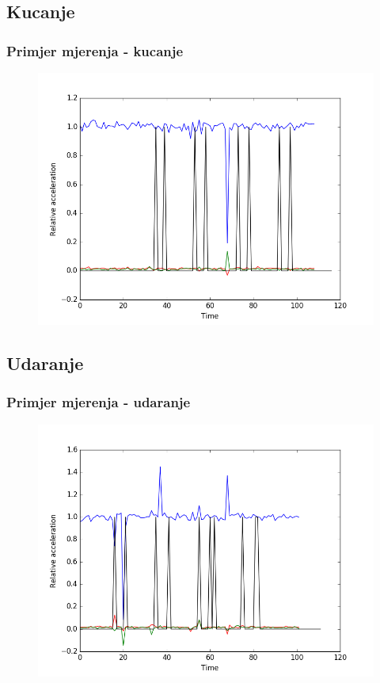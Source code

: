 \documentclass[12pt]{beamer}
\begin{document}
\subsection{Kucanje}
\begin{frame}
	\frametitle{Primjer mjerenja - kucanje}
	
	\begin{figure}[h]
		\centering
		\includegraphics[width=0.8\linewidth]{slike/click.png}
	\end{figure}

\end{frame}

\subsection{Udaranje}
\begin{frame}
	\frametitle{Primjer mjerenja - udaranje}
	\begin{figure}[h]
		\centering
		\includegraphics[width=0.8\linewidth]{slike/aggro.png}
	\end{figure}
\end{frame}
\end{document}
